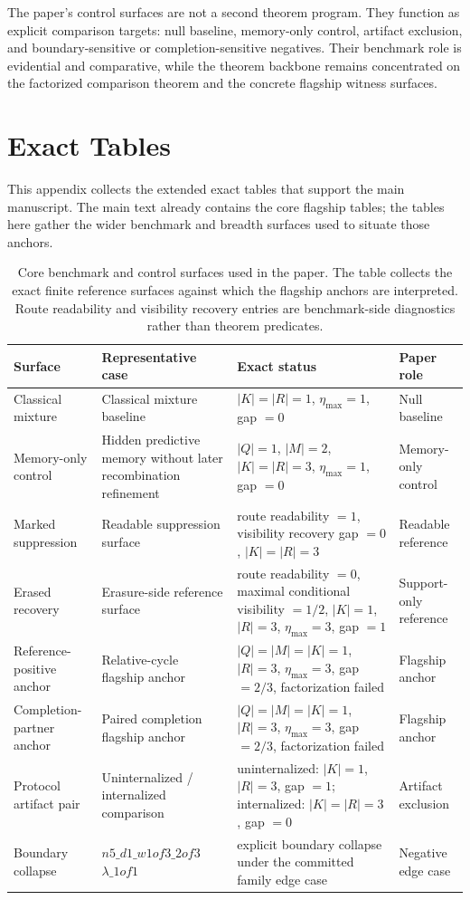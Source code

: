 \documentclass[11pt]{article}
\theoremstyle{definition}
\begin{document}
The paper's control surfaces are not a second theorem program. They function as explicit comparison targets: null baseline, memory-only control, artifact exclusion, and boundary-sensitive or completion-sensitive negatives. Their benchmark role is evidential and comparative, while the theorem backbone remains concentrated on the factorized comparison theorem and the concrete flagship witness surfaces.
 \section{Exact Tables}

This appendix collects the extended exact tables that support the main manuscript. The main text already contains the core flagship tables; the tables here gather the wider benchmark and breadth surfaces used to situate those anchors.

\begin{table}[p]
\centering
\caption{Core benchmark and control surfaces used in the paper. The table collects the exact finite reference surfaces against which the flagship anchors are interpreted. Route readability and visibility recovery entries are benchmark-side diagnostics rather than theorem predicates.}
\label{tab:core-benchmark-registry}
\begin{tabular}{p{2.8cm}p{3.4cm}p{4.4cm}p{2.4cm}}
\toprule
Surface & Representative case & Exact status & Paper role \\
\midrule
Classical mixture &
Classical mixture baseline &
$|K|=|R|=1$, $\eta_{\max}=1$, gap $=0$ &
Null baseline \\
\addlinespace
Memory-only control &
Hidden predictive memory without later recombination refinement &
$|Q|=1$, $|M|=2$, $|K|=|R|=3$, $\eta_{\max}=1$, gap $=0$ &
Memory-only control \\
\addlinespace
Marked suppression &
Readable suppression surface &
route readability $=1$, visibility recovery gap $=0$, $|K|=|R|=3$ &
Readable reference \\
\addlinespace
Erased recovery &
Erasure-side reference surface &
route readability $=0$, maximal conditional visibility $=1/2$, $|K|=1$, $|R|=3$, $\eta_{\max}=3$, gap $=1$ &
Support-only reference \\
\addlinespace
Reference-positive anchor &
Relative-cycle flagship anchor &
$|Q|=|M|=|K|=1$, $|R|=3$, $\eta_{\max}=3$, gap $=2/3$, factorization failed &
Flagship anchor \\
\addlinespace
Completion-partner anchor &
Paired completion flagship anchor &
$|Q|=|M|=|K|=1$, $|R|=3$, $\eta_{\max}=3$, gap $=2/3$, factorization failed &
Flagship anchor \\
\addlinespace
Protocol artifact pair &
Uninternalized / internalized comparison &
uninternalized: $|K|=1$, $|R|=3$, gap $=1$; internalized: $|K|=|R|=3$, gap $=0$ &
Artifact exclusion \\
\addlinespace
Boundary collapse &
$n5\_d1\_w1of3\_2of3$\newline$\lambda\_1of1$ &
explicit boundary collapse under the committed family edge case &
Negative edge case \\
\bottomrule
\end{tabular}
\end{table}
 
\end{document}
